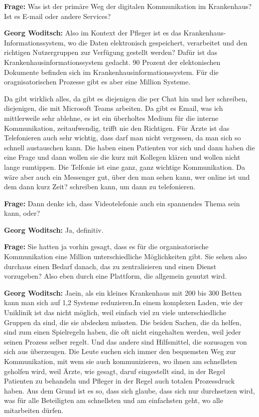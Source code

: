 \textbf{Frage: }  Was ist der primäre Weg der digitalen Kommunikation im Krankenhaus? Ist es E-mail oder andere Services?

\textbf{Georg Woditsch: } Also im Kontext der Pfleger ist es das Krankenhaus-Informationssystem, wo die Daten elektronisch gespeichert, verarbeitet und den richtigen Nutzergruppen zur Verfügung gestellt werden? Dafür ist das Krankenhausinformationssystem gedacht. 90 Prozent der elektonischen Dokumente befinden sich im Krankenhausinformationssystem. Für die oragnisatorischen Prozesse gibt es aber eine Million Systeme.

Da gibt wirklich alles, da gibt es diejenigen die per Chat hin und her schreiben, diejenigen, die mit Microsoft Teams arbeiten. Da gibt es Email, was ich mittlerweile sehr ablehne, es ist ein überholtes Medium für die interne Kommunikation, zeitaufwendig, trifft nie den Richtigen. Für Ärzte ist das Telefonieren auch sehr wichtig, dass darf man nicht vergessen, da man sich so schnell austauschen kann. Die haben einen Patienten vor sich und dann haben die eine Frage und dann wollen sie die kurz mit Kollegen klären und wollen nicht lange rumtippen. Die Telfonie ist eine ganz, ganz wichtige Kommunikation. Da wäre aber auch ein Messenger gut, über den man sehen kann, wer online ist und dem dann kurz Zeit? schreiben kann, um dann zu telefonieren.

\textbf{Frage: } Dann denke ich, dass Videotelefonie auch ein spannendes Thema sein kann, oder?

\textbf{Georg Woditsch: } Ja, definitiv.

\textbf{Frage: } Sie hatten ja vorhin gesagt, dass es für die organisatorische Kommunikation eine Million unterschiedliche Möglichkeiten gibt. Sie sehen also durchaus einen Bedarf danach, das zu zentralisieren und einen Dienst vorzugeben? Also eben durch eine Plattform, die allgemein genutzt wird.

\textbf{Georg Woditsch: } Jaein, als ein kleines Krankenhaus mit 200 bis 300 Betten kann man sich auf 1,2 Systeme reduzieren.In einem komplexen Laden, wie der Uniklinik ist das nicht möglich, weil einfach viel zu viele unterschiedliche Gruppen da sind, die sie abdecken müssten. Die beiden Sachen, die da helfen, sind zum einen Spielregeln haben, die oft nicht eingehalten werden, weil jeder seinen Prozess selber regelt. Und das andere sind Hilfsmittel, die sozusagen von sich aus überzeugen. Die Leute suchen sich immer den bequemsten Weg zur Kommunikation, mit wem sie auch kommunizieren, wo ihnen am schnellsten geholfen wird, weil Ärzte, wie gesagt, daruf eingestellt sind, in der Regel Patienten zu behandeln und Pfleger in der Regel auch totalen Prozessdruck haben. Aus dem Grund ist es so, dass sich glaube, dass sich nur durchsetzen wird, was für alle Beteiligten am schnellsten und am einfachsten geht, wo alle mitarbeiten dürfen.

